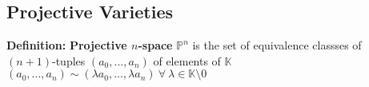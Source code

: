\documentclass[14pt]{extarticle}
\def\Definition{{\color{blue} \textbf{Definition:} }}
\begin{document}
\begin{outline}
		\subsection*{Projective Varieties}	
		\1	\Definition \textbf{Projective $n$-space}
			\2	$\mathbb{P}^n$ is the set of equivalence classses of $(n+1)$-tuples
					$(a_0,...,a_n)$ of elements of $\mathbb{K}$
			\2	$(a_0,...,a_n) \sim (\lambda a_0,...,\lambda a_n)~\forall~\lambda \in \mathbb{K} \setminus 0$

	\end{outline}
\end{document}
